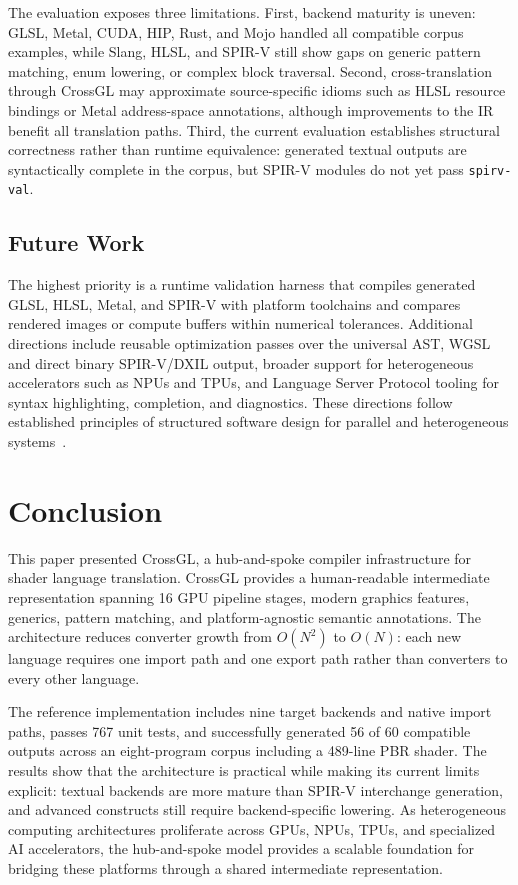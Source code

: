 \documentclass{svproc}
\begin{document}
The evaluation exposes three limitations. First, backend maturity is uneven: GLSL, Metal, CUDA, HIP, Rust, and Mojo handled all compatible corpus examples, while Slang, HLSL, and SPIR-V still show gaps on generic pattern matching, enum lowering, or complex block traversal. Second, cross-translation through CrossGL may approximate source-specific idioms such as HLSL resource bindings or Metal address-space annotations, although improvements to the IR benefit all translation paths. Third, the current evaluation establishes structural correctness rather than runtime equivalence: generated textual outputs are syntactically complete in the corpus, but SPIR-V modules do not yet pass \texttt{spirv-val}.

\subsection{Future Work}

The highest priority is a runtime validation harness that compiles generated GLSL, HLSL, Metal, and SPIR-V with platform toolchains and compares rendered images or compute buffers within numerical tolerances. Additional directions include reusable optimization passes over the universal AST, WGSL and direct binary SPIR-V/DXIL output, broader support for heterogeneous accelerators such as NPUs and TPUs, and Language Server Protocol tooling for syntax highlighting, completion, and diagnostics. These directions follow established principles of structured software design for parallel and heterogeneous systems~\cite{mccool2012structured}.

\section{Conclusion}

This paper presented CrossGL, a hub-and-spoke compiler infrastructure for shader language translation. CrossGL provides a human-readable intermediate representation spanning 16 GPU pipeline stages, modern graphics features, generics, pattern matching, and platform-agnostic semantic annotations. The architecture reduces converter growth from $O(N^2)$ to $O(N)$: each new language requires one import path and one export path rather than converters to every other language.

The reference implementation includes nine target backends and native import paths, passes 767 unit tests, and successfully generated 56 of 60 compatible outputs across an eight-program corpus including a 489-line PBR shader. The results show that the architecture is practical while making its current limits explicit: textual backends are more mature than SPIR-V interchange generation, and advanced constructs still require backend-specific lowering. As heterogeneous computing architectures proliferate across GPUs, NPUs, TPUs, and specialized AI accelerators, the hub-and-spoke model provides a scalable foundation for bridging these platforms through a shared intermediate representation.
\end{document}
